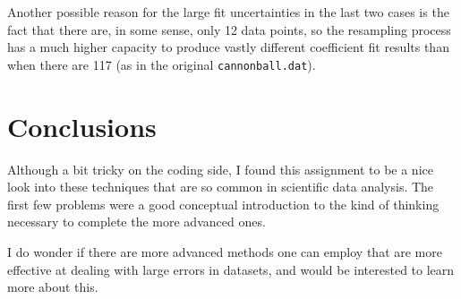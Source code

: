 \documentclass{article}
\begin{document}
Another possible reason for the large fit uncertainties in the last two cases is the fact that there are, in some sense, only 12 data points, so the resampling process has a much higher capacity to produce vastly different coefficient fit results than when there are 117 (as in the original \texttt{cannonball.dat}).

\section{Conclusions}

Although a bit tricky on the coding side, I found this assignment to be a nice look into these techniques that are so common in scientific data analysis. The first few problems were a good conceptual introduction to the kind of thinking necessary to complete the more advanced ones.

I do wonder if there are more advanced methods one can employ that are more effective at dealing with large errors in datasets, and would be interested to learn more about this.
\end{document}

